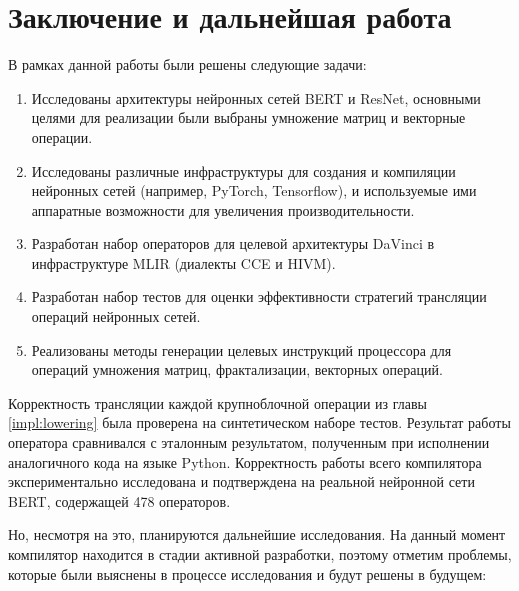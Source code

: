 \section{Заключение и дальнейшая работа}
\label{sec:Conclusion} 

В рамках данной работы были решены следующие задачи:

\begin{enumerate}
    \item Исследованы архитектуры нейронных сетей BERT и ResNet,
          основными целями для реализации были выбраны умножение матриц и
          векторные операции.
    \item Исследованы различные инфраструктуры для создания и компиляции
          нейронных сетей (например, PyTorch, Tensorflow), и используемые ими
          аппаратные возможности для увеличения производительности.
    \item Разработан набор операторов для целевой архитектуры DaVinci в
          инфраструктуре MLIR (диалекты CCE и HIVM).
    \item Разработан набор тестов для оценки эффективности стратегий трансляции
          операций нейронных сетей.
    \item Реализованы методы генерации целевых инструкций процессора
          для операций умножения матриц, фрактализации, векторных операций.
\end{enumerate}


Корректность трансляции каждой крупноблочной операции из главы
\ref{impl:lowering} была проверена на синтетическом наборе тестов. Результат
работы оператора сравнивался с эталонным результатом, полученным при исполнении
аналогичного кода на языке Python. Корректность работы всего компилятора
экспериментально исследована и подтверждена на реальной нейронной сети BERT,
содержащей 478 операторов.

Но, несмотря на это, планируются дальнейшие исследования.
На данный момент компилятор находится в стадии активной разработки, поэтому
отметим проблемы, которые были выяснены в процессе исследования и будут решены
в будущем:

